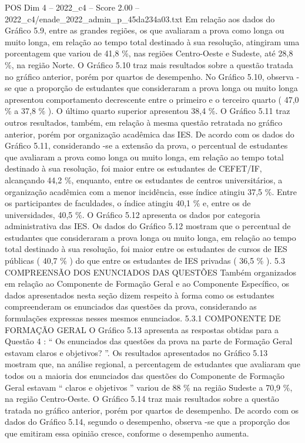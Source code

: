 \begin{textsample}{POS Dim 4 – 2022\_c4 – Score 2.00 – 2022\_c4/enade\_2022\_admin\_p\_45da234a03.txt}
Em relação aos dados do Gráfico 5.9, entre as grandes regiões, os que avaliaram a prova como longa ou muito longa, em relação ao tempo total destinado à sua resolução, atingiram uma porcentagem que variou de 41,8 \%, nas regiões Centro-Oeste e Sudeste, até 28,8 \%, na região Norte.
O Gráfico 5.10 traz mais resultados sobre a questão tratada no gráfico anterior, porém por quartos de desempenho.
No Gráfico 5.10, observa -se que a proporção de estudantes que consideraram a prova longa ou muito longa apresentou comportamento decrescente entre o primeiro e o terceiro quarto ( 47,0 \% a 37,8 \% ).
O último quarto superior apresentou 38,4 \%.
O Gráfico 5.11 traz outros resultados, também, em relação à mesma questão retratada no gráfico anterior, porém por organização acadêmica das IES.
De acordo com os dados do Gráfico 5.11, considerando -se a extensão da prova, o percentual de estudantes que avaliaram a prova como longa ou muito longa, em relação ao tempo total destinado à sua resolução, foi maior entre os estudantes de CEFET/IF, alcançando 44,2 \%, enquanto, entre os estudantes de centros universitários, a organização acadêmica com a menor incidência, esse índice atingiu 37,5 \%.
Entre os participantes de faculdades, o índice atingiu 40,1 \% e, entre os de universidades, 40,5 \%.
O Gráfico 5.12 apresenta os dados por categoria administrativa das IES.
Os dados do Gráfico 5.12 mostram que o percentual de estudantes que consideraram a prova longa ou muito longa, em relação ao tempo total destinado à sua resolução, foi maior entre os estudantes de cursos de IES públicas ( 40,7 \% ) do que entre os estudantes de IES privadas ( 36,5 \% ). 5.3 COMPREENSÃO DOS ENUNCIADOS DAS QUESTÕES Também organizados em relação ao Componente de Formação Geral e ao Componente Específico, os dados apresentados nesta seção dizem respeito à forma como os estudantes compreenderam os enunciados das questões da prova, considerando as formulações expressas nesses mesmos enunciados. 5.3.1 COMPONENTE DE FORMAÇÃO GERAL O Gráfico 5.13 apresenta as respostas obtidas para a Questão 4 : “ Os enunciados das questões da prova na parte de Formação Geral estavam claros e objetivos? ”.
Os resultados apresentados no Gráfico 5.13 mostram que, na análise regional, a percentagem de estudantes que avaliaram que todos ou a maioria dos enunciados das questões do Componente de Formação Geral estavam “ claros e objetivos ” variou de 88 \% na região Sudeste a 70,9 \%, na região Centro-Oeste.
O Gráfico 5.14 traz mais resultados sobre a questão tratada no gráfico anterior, porém por quartos de desempenho.
De acordo com os dados do Gráfico 5.14, segundo o desempenho, observa -se que a proporção dos que emitiram essa opinião cresce, conforme o desempenho aumenta.

\end{textsample}

